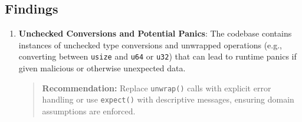 \documentclass[12pt,a4paper]{article}
\begin{document}
\subsection{Findings}
\label{sec:monero-rpc-findings}

\begin{enumerate}
    \item \textbf{Unchecked Conversions and Potential Panics}:
    The codebase contains instances of unchecked type conversions and unwrapped operations (e.g., converting between \texttt{usize} and \texttt{u64} or \texttt{u32}) that can lead to runtime
    panics if given malicious or otherwise unexpected data.
    \begin{quote}
     \textbf{Recommendation:} Replace \texttt{unwrap()} calls with explicit error handling or use \texttt{expect()} with descriptive messages, ensuring domain assumptions are enforced.
    \end{quote}





\end{enumerate}
\end{document}
